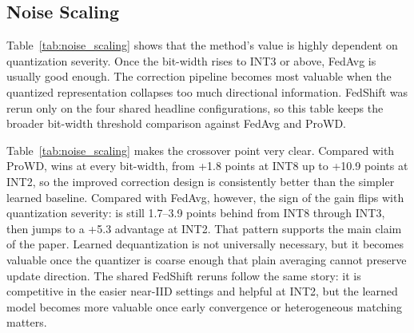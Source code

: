 \subsection{Noise Scaling}

Table~\ref{tab:noise_scaling} shows that the method's value is highly dependent
on quantization severity. Once the bit-width rises to INT3 or above, FedAvg is
usually good enough. The correction pipeline becomes most valuable when the
quantized representation collapses too much directional information. FedShift
was rerun only on the four shared headline configurations, so this table keeps
the broader bit-width threshold comparison against FedAvg and ProWD.

\begin{table}[h]
  \centering
  \caption{Round-20 accuracy under different near-IID bit-widths with 20\%
  anchors.}
  \label{tab:noise_scaling}
  \small
\end{table}

Table~\ref{tab:noise_scaling} makes the crossover point very clear. Compared
with ProWD, \method wins at every bit-width, from +1.8 points at INT8 up to
+10.9 points at INT2, so the improved correction design is consistently better
than the simpler learned baseline. Compared with FedAvg, however, the sign of
the gain flips with quantization severity: \method is still 1.7--3.9 points
behind from INT8 through INT3, then jumps to a +5.3 advantage at INT2. That
pattern supports the main claim of the paper. Learned dequantization is not
universally necessary, but it becomes valuable once the quantizer is coarse
enough that plain averaging cannot preserve update direction. The shared
FedShift reruns follow the same story: it is competitive in the easier near-IID
settings and helpful at INT2, but the learned model becomes more valuable once
early convergence or heterogeneous matching matters.

